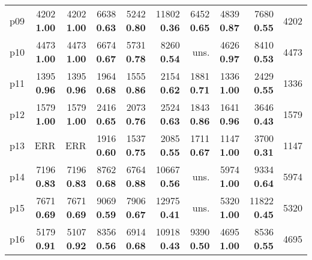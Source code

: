 \begin{tabular}{|l|rrrrrrrr|r|}
p09 & {\footnotesize 4202} \textbf{1.00} & {\footnotesize 4202} \textbf{1.00} & {\footnotesize 6638} \textbf{0.63} & {\footnotesize 5242} \textbf{0.80} & {\footnotesize 11802} \textbf{0.36} & {\footnotesize 6452} \textbf{0.65} & {\footnotesize 4839} \textbf{0.87} & {\footnotesize 7680} \textbf{0.55} & 4202\\
p10 & {\footnotesize 4473} \textbf{1.00} & {\footnotesize 4473} \textbf{1.00} & {\footnotesize 6674} \textbf{0.67} & {\footnotesize 5731} \textbf{0.78} & {\footnotesize 8260} \textbf{0.54} & uns. & {\footnotesize 4626} \textbf{0.97} & {\footnotesize 8410} \textbf{0.53} & 4473\\
p11 & {\footnotesize 1395} \textbf{0.96} & {\footnotesize 1395} \textbf{0.96} & {\footnotesize 1964} \textbf{0.68} & {\footnotesize 1555} \textbf{0.86} & {\footnotesize 2154} \textbf{0.62} & {\footnotesize 1881} \textbf{0.71} & {\footnotesize 1336} \textbf{1.00} & {\footnotesize 2429} \textbf{0.55} & 1336\\
p12 & {\footnotesize 1579} \textbf{1.00} & {\footnotesize 1579} \textbf{1.00} & {\footnotesize 2416} \textbf{0.65} & {\footnotesize 2073} \textbf{0.76} & {\footnotesize 2524} \textbf{0.63} & {\footnotesize 1843} \textbf{0.86} & {\footnotesize 1641} \textbf{0.96} & {\footnotesize 3646} \textbf{0.43} & 1579\\
p13 & ERR & ERR & {\footnotesize 1916} \textbf{0.60} & {\footnotesize 1537} \textbf{0.75} & {\footnotesize 2085} \textbf{0.55} & {\footnotesize 1711} \textbf{0.67} & {\footnotesize 1147} \textbf{1.00} & {\footnotesize 3700} \textbf{0.31} & 1147\\
p14 & {\footnotesize 7196} \textbf{0.83} & {\footnotesize 7196} \textbf{0.83} & {\footnotesize 8762} \textbf{0.68} & {\footnotesize 6764} \textbf{0.88} & {\footnotesize 10667} \textbf{0.56} & uns. & {\footnotesize 5974} \textbf{1.00} & {\footnotesize 9334} \textbf{0.64} & 5974\\
p15 & {\footnotesize 7671} \textbf{0.69} & {\footnotesize 7671} \textbf{0.69} & {\footnotesize 9069} \textbf{0.59} & {\footnotesize 7906} \textbf{0.67} & {\footnotesize 12975} \textbf{0.41} & uns. & {\footnotesize 5320} \textbf{1.00} & {\footnotesize 11822} \textbf{0.45} & 5320\\
p16 & {\footnotesize 5179} \textbf{0.91} & {\footnotesize 5107} \textbf{0.92} & {\footnotesize 8356} \textbf{0.56} & {\footnotesize 6914} \textbf{0.68} & {\footnotesize 10918} \textbf{0.43} & {\footnotesize 9390} \textbf{0.50} & {\footnotesize 4695} \textbf{1.00} & {\footnotesize 8536} \textbf{0.55} & 4695\\

\end{tabular}
